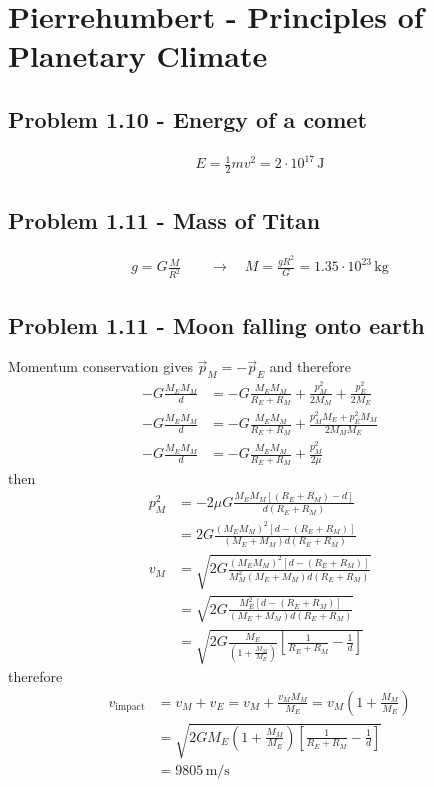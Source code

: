\documentclass[10pt,a4paper]{book}
\theoremstyle{definition}
\begin{document}
\newpage
\section{{\sc Pierrehumbert} - Principles of Planetary Climate}
\subsection{Problem 1.10 - Energy of a comet}
\begin{align}
E=\frac{1}{2}mv^2=2\cdot 10^{17}\,\text{J}
\end{align}

\subsection{Problem 1.11 - Mass of Titan}
\begin{align}
g=G\frac{M}{R^2}\qquad\rightarrow\quad M=\frac{gR^2}{G}=1.35\cdot10^{23}\,\text{kg}
\end{align}

\subsection{Problem 1.11 - Moon falling onto earth}
Momentum conservation gives $\vec{p}_M=-\vec{p}_E$ and therefore
\begin{align}
-G\frac{M_EM_M}{d}&=-G\frac{M_EM_M}{R_E+R_M}+\frac{p_M^2}{2M_M}+\frac{p_E^2}{2M_E}\\
-G\frac{M_EM_M}{d}&=-G\frac{M_EM_M}{R_E+R_M}+\frac{p_M^2M_E+p_E^2M_M}{2M_MM_E}\\
-G\frac{M_EM_M}{d}&=-G\frac{M_EM_M}{R_E+R_M}+\frac{p_M^2}{2\mu}
\end{align}
then
\begin{align}
p_M^2&=-2\mu G\frac{M_EM_M\left[(R_E+R_M)-d\right]}{d(R_E+R_M)}\\
&=2 G\frac{(M_EM_M)^2\left[d-(R_E+R_M)\right]}{(M_E+M_M)d(R_E+R_M)}\\
v_M&=\sqrt{2 G\frac{(M_EM_M)^2\left[d-(R_E+R_M)\right]}{M_M^2(M_E+M_M)d(R_E+R_M)}}\\
&=\sqrt{2 G\frac{M_E^2\left[d-(R_E+R_M)\right]}{(M_E+M_M)d(R_E+R_M)}}\\
&=\sqrt{2 G\frac{M_E}{(1+\frac{M_M}{M_E})}\left[\frac{1}{R_E+R_M}-\frac{1}{d}\right]}
\end{align}
therefore 
\begin{align}
v_\text{impact}
&=v_M+v_E=v_M+\frac{v_MM_M}{M_E}=v_M\left(1+\frac{M_M}{M_E}\right)\\
&=\sqrt{2 GM_E\left(1+\frac{M_M}{M_E}\right)\left[\frac{1}{R_E+R_M}-\frac{1}{d}\right]}\\
&=9805\,\text{m/s}
\end{align}
\end{document}
